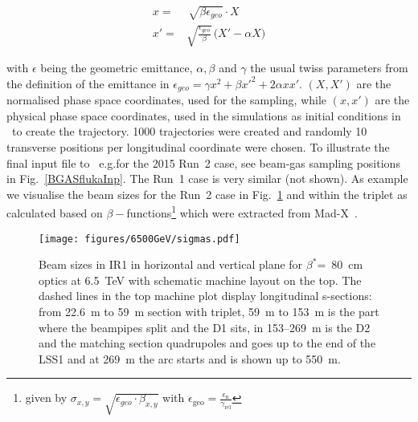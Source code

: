 \begin{equation} \label{eq1}
  \begin{split}
x = & \, \sqrt{\beta \epsilon_{geo}} \cdot X \\
x' = & \sqrt{\frac{\epsilon_{geo}}{\beta}} \, \big( X' - \alpha X \big)
  \end{split}
\end{equation}

with $\epsilon$ being the geometric emittance, $\alpha, \beta$ and $\gamma$ the usual twiss parameters from the definition of the emittance in $\epsilon_{geo} = \gamma x^2 + \beta x'^2 + 2 \alpha x x'$. $(X,X')$ are the normalised phase space coordinates, used for the sampling, while $(x,x')$ are the physical phase space coordinates, used in the simulations as initial conditions in \fluka~to create the trajectory. 1000 trajectories were created and randomly 10 transverse positions per longitudinal coordinate were chosen. To illustrate the final input file to \fluka~e.g.for the 2015 Run~2 case, see beam-gas sampling positions in Fig.~\ref{BGASflukaInp}. The Run~1 case is very similar (not shown). As example we visualise the beam sizes for the Run~2 case in Fig.~\ref{twissfileBS} and within the triplet as calculated based on $\beta-$functions\footnote{given by $\sigma_{x,y} = \sqrt{\epsilon_{geo} \cdot \beta_{x,y}}$ with $\epsilon_{\textrm{geo}} = \frac{ \epsilon_{\textrm{n}}}{\gamma_{\textrm{rel}}}$} which were extracted from Mad-X~\cite{madx}.


\begin{figure}%
\begin{center}
  \texttt{[image: figures/6500GeV/sigmas.pdf]}
\end{center}
\vspace{-0.6cm}
 \caption{Beam sizes in IR1 in horizontal and vertical plane for $\beta^*$=~80~cm optics at 6.5~TeV with schematic machine layout on the top. The dashed lines in the top machine plot display longitudinal s-sections: from 22.6~m to 59~m section with triplet, 59~m to 153~m is the part where the beampipes split and the D1 sits, in 153--269~m is the D2 and the matching section quadrupoles and goes up to the end of the LSS1 and at 269~m the arc starts and is shown up to 550~m.
  \label{twissfileBS}}
\end{figure}
 

